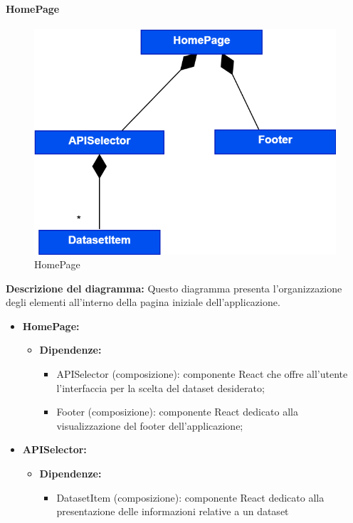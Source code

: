 \pagebreak

\paragraph{HomePage}
\begin{figure}[h!] \centering
      \includegraphics[scale=0.3]{template/images/uml_front/ui/HomePage.png}
      \caption{HomePage}
\end{figure}
\textbf{Descrizione del diagramma:}
Questo diagramma presenta l'organizzazione degli elementi all'interno della pagina iniziale dell'applicazione.
\begin{itemize}
      \item \textbf{HomePage:}
            \begin{itemize}
                  \item \textbf{Dipendenze:}
                        \begin{itemize}
                              \item APISelector (composizione): componente React che offre all'utente l'interfaccia
                                    per la scelta del dataset desiderato;
                              \item Footer (composizione): componente React dedicato alla visualizzazione del
                                    footer dell'applicazione;
                        \end{itemize}
            \end{itemize}

      \item \textbf{APISelector:}
            \begin{itemize}
                  \item \textbf{Dipendenze:}
                        \begin{itemize}
                              \item DatasetItem (composizione): componente React dedicato alla presentazione delle
                                    informazioni relative a un dataset
                        \end{itemize}
            \end{itemize}
\end{itemize}

